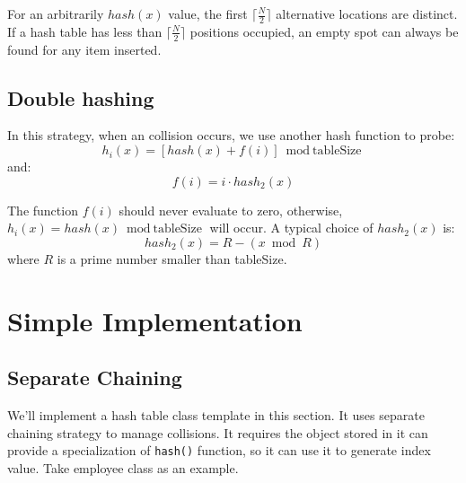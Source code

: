 \documentclass[12pt]{book}
\begin{document}
For an arbitrarily \(hash(x)\) value, the first \(\lceil \frac {N} {2} \rceil\) alternative locations are distinct. If a hash table has less than \(\lceil \frac {N} {2} \rceil\) positions occupied, an empty spot can always be found for any item inserted.

\subsection{Double hashing}
\label{sec:org943c933}
In this strategy, when an collision occurs, we use another hash function to probe:
\[
h_i(x) = [hash(x) + f(i)] \bmod \text{tableSize}
\]
and:
\[
f(i) = i \cdot hash_2(x)
\]

The function \(f(i)\) should never evaluate to zero, otherwise, \(h_i(x) = hash(x) \bmod \text{tableSize}\) will occur. A typical choice of \(hash_2(x)\) is:
\[
hash_2(x) = R - (x \bmod R)
\]
where \(R\) is a prime number smaller than tableSize.
\section{Simple Implementation}
\label{sec:orgfba7865}
\subsection{Separate Chaining}
\label{sec:orgc27c3e0}
We'll implement a hash table class template in this section. It uses separate chaining strategy to manage collisions. It requires the object stored in it can provide a specialization of \texttt{hash()} function, so it can use it to generate index value. Take employee class as an example.
\end{document}
